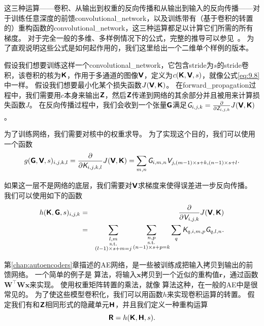 这三种运算——卷积、从输出到权重的反向传播和从输出到输入的反向传播——对于训练任意深度的前馈\gls{convolutional_network}，以及训练带有（基于卷积的转置的）重构函数的\gls{convolutional_network}，这三种运算都足以计算它们所需的所有梯度。
对于完全一般的多维、多样例情况下的公式，完整的推导可以参见~\cite{Goodfellow-TR2010}。 
为了直观说明这些公式是如何起作用的，我们这里给出一个二维单个样例的版本。
 
 
假设我们想要训练这样一个\gls{convolutional_network}，它包含\gls{stride}为$s$的\gls{stride}卷积，该卷积的核为$\textsf{\textbf{K}}$，作用于多通道的图像$\textsf{\textbf{V}}$，定义为$c(\textsf{\textbf{K}}, \textsf{\textbf{V}}, s)$，就像公式\ref{eq:9.8}中一样。
假设我们想要最小化某个损失函数$J(\textsf{\textbf{V}}, \textsf{\textbf{K}})$。
在\gls{forward_propagation}过程中，我们需要用$c$本身来输出$\textsf{\textbf{Z}}$，然后$\textsf{\textbf{Z}}$传递到网络的其余部分并且被用来计算损失函数$J$。
在反向传播过程中，我们会收到一个张量$\textsf{\textbf{G}}$满足$\textit{\textsf{G}}_{i, j, k} = \frac{\partial}{\partial \textit{\textsf{Z}}_{i, j, k}} J(\textsf{\textbf{V}}, \textsf{\textbf{K}})$。

为了训练网络，我们需要对核中的权重求导。
为了实现这个目的，我们可以使用一个函数
\begin{equation}
g(\textsf{\textbf{G}}, \textsf{\textbf{V}}, s)_{i, j, k, l} = \frac{\partial}{\partial \textit{\textsf{K}}_{i, j, k, l}} J(\textsf{\textbf{V}}, \textsf{\textbf{K}}) = \sum_{m, n} \textit{\textsf{G}}_{i, m, n} \textit{\textsf{V}}_{j, (m-1)\times s+k, (n-1)\times s+l}.
\end{equation}

如果这一层不是网络的底层，我们需要对$\textsf{\textbf{V}}$求梯度来使得误差进一步反向传播。
我们可以使用如下的函数
\begin{eqnarray}
h(\textsf{\textbf{K}}, \textsf{\textbf{G}}, s)_{i, j, k} &=& \frac{\partial }{\partial \textit{\textsf{V}}_{i, j, k}} J(\textsf{\textbf{V}}, \textsf{\textbf{K}})\\
&=& \sum_{\substack{l, m\\
                  \text{s.t.}\\
                  (l-1)\times s+m = j}} \sum_{\substack{n, p\\
                                                            \text{s.t.}\\
                                                            (n-1)\times s +p = k}}
            \sum_q \textit{\textsf{K}}_{q,i,m,p} \textit{\textsf{G}}_{q, l, n}.
\end{eqnarray}

第\ref{chap:autoencoders}章描述的\gls{AE}网络，是一些被训练成把输入拷贝到输出的前馈网络。
一个简单的例子是\,\,算法，将输入$\bm{x}$拷贝到一个近似的重构值$\bm{r}$，通过函数$\bm{W}^\top \bm{Wx}$来实现。
使用权重矩阵转置的乘法，就像\,\,算法这种，在一般的\gls{AE}中是很常见的。
为了使这些模型卷积化，我们可以用函数$h$来实现卷积运算的转置。
假定我们有和$\textsf{\textbf{Z}}$相同形式的隐藏单元$\textsf{\textbf{H}}$，并且我们定义一种重构运算
\begin{equation}
\textsf{\textbf{R}} = h(\textsf{\textbf{K}}, \textsf{\textbf{H}}, s).
\end{equation}

